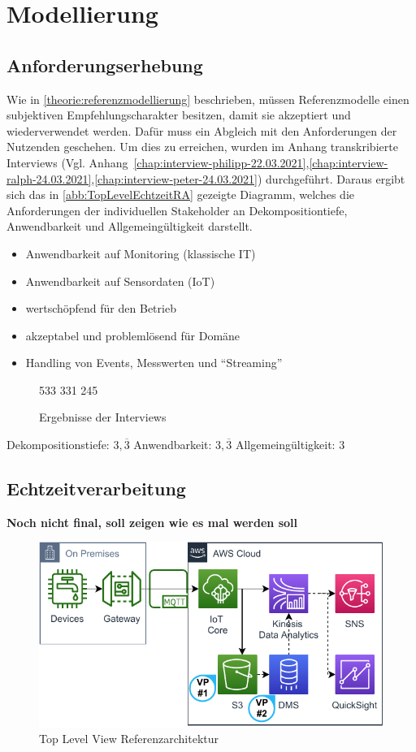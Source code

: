 \chapter{Modellierung}
\section{Anforderungserhebung}
Wie in \autoref{theorie:referenzmodellierung} beschrieben, müssen Referenzmodelle einen subjektiven Empfehlungscharakter besitzen, damit sie akzeptiert und wiederverwendet werden. Dafür muss ein Abgleich mit den Anforderungen der Nutzenden geschehen. Um dies zu erreichen, wurden im Anhang transkribierte Interviews (Vgl. Anhang~\ref{chap:interview-philipp-22.03.2021},\ref{chap:interview-ralph-24.03.2021},\ref{chap:interview-peter-24.03.2021}) durchgeführt. Daraus ergibt sich das in \autoref{abb:TopLevelEchtzeitRA} gezeigte Diagramm, welches die Anforderungen der individuellen Stakeholder an Dekompositiontiefe, Anwendbarkeit und Allgemeingültigkeit darstellt.


\begin{itemize}
\item Anwendbarkeit auf Monitoring (klassische IT)
\item Anwendbarkeit auf Sensordaten (\ac{IoT})
\item wertschöpfend für den Betrieb
\item akzeptabel und problemlösend für Domäne
\item Handling von Events, Messwerten und \enquote{Streaming}
\end{itemize}


\begin{figure}[H]
\centering
\spideroverview
{5}{3}{3}
{3}{3}{1}
{2}{4}{5}
\caption{Ergebnisse der Interviews}
\label{abb:DimensionenUebersicht}
\end{figure}
Dekompositionstiefe: $3,\overline{3}$
Anwendbarkeit: $3,\overline{3}$
Allgemeingültigkeit: $3$

\section{Echtzeitverarbeitung}
\textbf{Noch nicht final, soll zeigen wie es mal werden soll}
\begin{figure}[H]
\centering
\includegraphics[width=\textwidth]{graphics/Echtzeit-RA-Overview.pdf}
\caption{Top Level View Referenzarchitektur}
\label{abb:TopLevelEchtzeitRA}
\end{figure}

